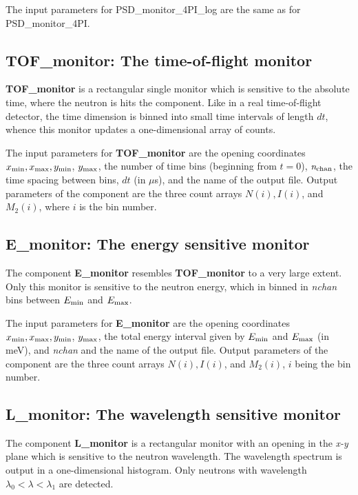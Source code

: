 The input parameters for PSD\_monitor\_4PI\_log are the same as for PSD\_monitor\_4PI.


\subsection{TOF\_monitor: The time-of-flight monitor}
{\bf TOF\_monitor} is a rectangular single monitor 
which is sensitive to
the absolute time, where the neutron is hits the component.
Like in a real time-of-flight detector, the time dimension is
binned into small time intervals of length $dt$, whence this monitor
updates a one-dimensional array of counts.

The input parameters for {\bf TOF\_monitor} are the opening 
coordinates $x_{\rm min}, x_{\rm max}, y_{\rm min}$, $y_{\rm max}$, 
the number of time bins (beginning from $t=0$),  
${\it n_{\rm chan}}$, the time spacing between bins, $dt$ (in $\mu$s), 
and the name of the output file. Output parameters of the component
are the three count arrays $N(i), I(i)$, and $M_2(i)$, where $i$ is
the bin number. 

\subsection{E\_monitor: The energy sensitive monitor}
\label{s:e_monitor}
The component {\bf E\_monitor} resembles {\bf TOF\_monitor}
to a very large extent. Only this monitor is sensitive to
the neutron energy, which in binned in \textit{nchan} bins between
$E_{\rm min}$ and $E_{\rm max}$.

The input parameters for {\bf E\_monitor} are the opening
coordinates $x_{\rm min}, x_{\rm max}, y_{\rm min}$, $y_{\rm max}$,
the total energy interval given by $E_{\rm min}$ and $E_{\rm max}$ (in meV), and
\textit{nchan} and the
name of the output file. Output parameters of the component
are the three count arrays
$N(i), I(i)$, and $M_2(i)$, $i$ being the bin number. 


\subsection{L\_monitor: The wavelength sensitive monitor}
\label{s:L_monitor}
The component {\bf L\_monitor} is a rectangular monitor with an opening
in the \textit{x-y} plane which is sensitive to the neutron wavelength.
The wavelength spectrum is output in a one-dimensional histogram.
Only neutrons with
wavelength $\lambda_0 < \lambda < \lambda_1$ are detected.

